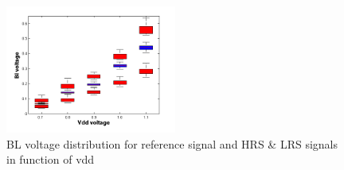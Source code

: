 \documentclass[journal]{IEEEtran}
\let\MYorigsubfloat\subfloat
\renewcommand{\subfloat}[2][\relax]{\MYorigsubfloat[]{#2}}
\begin{document}
\begin{figure}[h!t]
  \centering
  \includegraphics[width=0.5\textwidth]{../fig/hfdst-final-vddbl.png}
  \caption{BL voltage distribution for reference signal and HRS \& LRS signals in function of vdd}
  \label{fig:vblvdd}
\end{figure}
%
%



%
%
\end{document}
